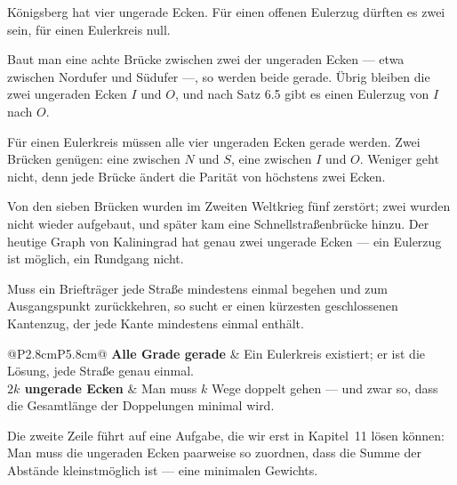 \begin{merksatz}
Königsberg hat vier ungerade Ecken. Für einen offenen Eulerzug dürften es zwei sein, für einen Eulerkreis null.

Baut man eine achte Brücke zwischen zwei der ungeraden Ecken --- etwa zwischen Nordufer und Südufer ---, so werden beide gerade. Übrig bleiben die zwei ungeraden Ecken $I$ und $O$, und nach Satz 6.5 gibt es einen Eulerzug von $I$ nach $O$.

Für einen Eulerkreis müssen alle vier ungeraden Ecken gerade werden. Zwei Brücken genügen: eine zwischen $N$ und $S$, eine zwischen $I$ und $O$. Weniger geht nicht, denn jede Brücke ändert die Parität von höchstens zwei Ecken.

Von den sieben Brücken wurden im Zweiten Weltkrieg fünf zerstört; zwei wurden nicht wieder aufgebaut, und später kam eine Schnellstraßenbrücke hinzu. Der heutige Graph von Kaliningrad hat genau zwei ungerade Ecken --- ein Eulerzug ist möglich, ein Rundgang nicht.
\end{merksatz}

\begin{merksatz}
Muss ein Briefträger jede Straße mindestens einmal begehen und zum Ausgangspunkt zurückkehren, so sucht er einen kürzesten geschlossenen Kantenzug, der jede Kante mindestens einmal enthält.

\begin{center}
\renewcommand{\arraystretch}{1.5}
\begin{tabular}{@{}P{2.8cm}P{5.8cm}@{}}
\toprule
\textbf{Alle Grade gerade} & Ein Eulerkreis existiert; er ist die Lösung, jede Straße genau einmal.\\
\textbf{$2k$ ungerade Ecken} & Man muss $k$ Wege doppelt gehen --- und zwar so, dass die Gesamtlänge der Doppelungen minimal wird.\\
\bottomrule
\end{tabular}
\end{center}

Die zweite Zeile führt auf eine Aufgabe, die wir erst in Kapitel~11 lösen können: Man muss die ungeraden Ecken paarweise so zuordnen, dass die Summe der Abstände kleinstmöglich ist --- eine  minimalen Gewichts.

\begin{center}
\begin{minipage}{0.88\textwidth}
\end{minipage}
\end{center}
\end{merksatz}

